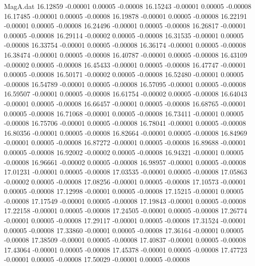 \begin{filecontents}{MagA.dat}
  16.12859   -0.00001    0.00005   -0.00008
  16.15243   -0.00001    0.00005   -0.00008
  16.17485   -0.00001    0.00005   -0.00008
  16.19878   -0.00001    0.00005   -0.00008
  16.22191   -0.00001    0.00005   -0.00008
  16.24496   -0.00001    0.00005   -0.00008
  16.26817   -0.00001    0.00005   -0.00008
  16.29114   -0.00002    0.00005   -0.00008
  16.31535   -0.00001    0.00005   -0.00008
  16.33754   -0.00001    0.00005   -0.00008
  16.36174   -0.00001    0.00005   -0.00008
  16.38474   -0.00001    0.00005   -0.00008
  16.40787   -0.00001    0.00005   -0.00008
  16.43109   -0.00002    0.00005   -0.00008
  16.45433   -0.00001    0.00005   -0.00008
  16.47747   -0.00001    0.00005   -0.00008
  16.50171   -0.00002    0.00005   -0.00008
  16.52480   -0.00001    0.00005   -0.00008
  16.54789   -0.00001    0.00005   -0.00008
  16.57095   -0.00001    0.00005   -0.00008
  16.59507   -0.00001    0.00005   -0.00008
  16.61754   -0.00002    0.00005   -0.00008
  16.64043   -0.00001    0.00005   -0.00008
  16.66457   -0.00001    0.00005   -0.00008
  16.68765   -0.00001    0.00005   -0.00008
  16.71068   -0.00001    0.00005   -0.00008
  16.73411   -0.00001    0.00005   -0.00008
  16.75706   -0.00001    0.00005   -0.00008
  16.78041   -0.00001    0.00005   -0.00008
  16.80356   -0.00001    0.00005   -0.00008
  16.82664   -0.00001    0.00005   -0.00008
  16.84969   -0.00001    0.00005   -0.00008
  16.87272   -0.00001    0.00005   -0.00008
  16.89688   -0.00001    0.00005   -0.00008
  16.92002   -0.00002    0.00005   -0.00008
  16.94321   -0.00001    0.00005   -0.00008
  16.96661   -0.00002    0.00005   -0.00008
  16.98957   -0.00001    0.00005   -0.00008
  17.01231   -0.00001    0.00005   -0.00008
  17.03535   -0.00001    0.00005   -0.00008
  17.05863   -0.00002    0.00005   -0.00008
  17.08256   -0.00001    0.00005   -0.00008
  17.10573   -0.00001    0.00005   -0.00008
  17.12998   -0.00001    0.00005   -0.00008
  17.15215   -0.00001    0.00005   -0.00008
  17.17549   -0.00001    0.00005   -0.00008
  17.19843   -0.00001    0.00005   -0.00008
  17.22158   -0.00001    0.00005   -0.00008
  17.24505   -0.00001    0.00005   -0.00008
  17.26774   -0.00001    0.00005   -0.00008
  17.29117   -0.00001    0.00005   -0.00008
  17.31524   -0.00001    0.00005   -0.00008
  17.33860   -0.00001    0.00005   -0.00008
  17.36164   -0.00001    0.00005   -0.00008
  17.38509   -0.00001    0.00005   -0.00008
  17.40837   -0.00001    0.00005   -0.00008
  17.43064   -0.00001    0.00005   -0.00008
  17.45378   -0.00001    0.00005   -0.00008
  17.47723   -0.00001    0.00005   -0.00008
  17.50029   -0.00001    0.00005   -0.00008

\end{filecontents}
